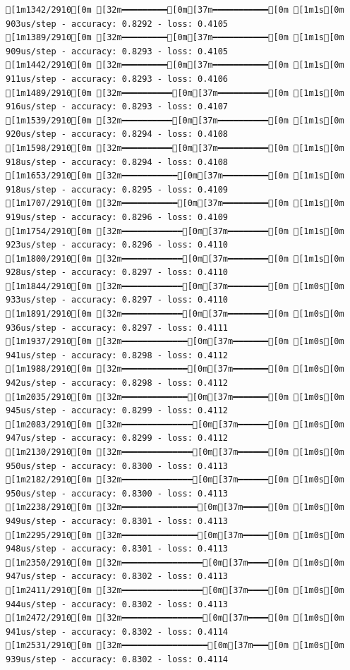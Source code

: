 \documentclass[
  letterpaper,
  DIV=11,
  numbers=noendperiod]{scrartcl}
\begin{document}
\begin{verbatim}
[1m1342/2910[0m [32m━━━━━━━━━[0m[37m━━━━━━━━━━━[0m [1m1s[0m 903us/step - accuracy: 0.8292 - loss: 0.4105
[1m1389/2910[0m [32m━━━━━━━━━[0m[37m━━━━━━━━━━━[0m [1m1s[0m 909us/step - accuracy: 0.8293 - loss: 0.4105
[1m1442/2910[0m [32m━━━━━━━━━[0m[37m━━━━━━━━━━━[0m [1m1s[0m 911us/step - accuracy: 0.8293 - loss: 0.4106
[1m1489/2910[0m [32m━━━━━━━━━━[0m[37m━━━━━━━━━━[0m [1m1s[0m 916us/step - accuracy: 0.8293 - loss: 0.4107
[1m1539/2910[0m [32m━━━━━━━━━━[0m[37m━━━━━━━━━━[0m [1m1s[0m 920us/step - accuracy: 0.8294 - loss: 0.4108
[1m1598/2910[0m [32m━━━━━━━━━━[0m[37m━━━━━━━━━━[0m [1m1s[0m 918us/step - accuracy: 0.8294 - loss: 0.4108
[1m1653/2910[0m [32m━━━━━━━━━━━[0m[37m━━━━━━━━━[0m [1m1s[0m 918us/step - accuracy: 0.8295 - loss: 0.4109
[1m1707/2910[0m [32m━━━━━━━━━━━[0m[37m━━━━━━━━━[0m [1m1s[0m 919us/step - accuracy: 0.8296 - loss: 0.4109
[1m1754/2910[0m [32m━━━━━━━━━━━━[0m[37m━━━━━━━━[0m [1m1s[0m 923us/step - accuracy: 0.8296 - loss: 0.4110
[1m1800/2910[0m [32m━━━━━━━━━━━━[0m[37m━━━━━━━━[0m [1m1s[0m 928us/step - accuracy: 0.8297 - loss: 0.4110
[1m1844/2910[0m [32m━━━━━━━━━━━━[0m[37m━━━━━━━━[0m [1m0s[0m 933us/step - accuracy: 0.8297 - loss: 0.4110
[1m1891/2910[0m [32m━━━━━━━━━━━━[0m[37m━━━━━━━━[0m [1m0s[0m 936us/step - accuracy: 0.8297 - loss: 0.4111
[1m1937/2910[0m [32m━━━━━━━━━━━━━[0m[37m━━━━━━━[0m [1m0s[0m 941us/step - accuracy: 0.8298 - loss: 0.4112
[1m1988/2910[0m [32m━━━━━━━━━━━━━[0m[37m━━━━━━━[0m [1m0s[0m 942us/step - accuracy: 0.8298 - loss: 0.4112
[1m2035/2910[0m [32m━━━━━━━━━━━━━[0m[37m━━━━━━━[0m [1m0s[0m 945us/step - accuracy: 0.8299 - loss: 0.4112
[1m2083/2910[0m [32m━━━━━━━━━━━━━━[0m[37m━━━━━━[0m [1m0s[0m 947us/step - accuracy: 0.8299 - loss: 0.4112
[1m2130/2910[0m [32m━━━━━━━━━━━━━━[0m[37m━━━━━━[0m [1m0s[0m 950us/step - accuracy: 0.8300 - loss: 0.4113
[1m2182/2910[0m [32m━━━━━━━━━━━━━━[0m[37m━━━━━━[0m [1m0s[0m 950us/step - accuracy: 0.8300 - loss: 0.4113
[1m2238/2910[0m [32m━━━━━━━━━━━━━━━[0m[37m━━━━━[0m [1m0s[0m 949us/step - accuracy: 0.8301 - loss: 0.4113
[1m2295/2910[0m [32m━━━━━━━━━━━━━━━[0m[37m━━━━━[0m [1m0s[0m 948us/step - accuracy: 0.8301 - loss: 0.4113
[1m2350/2910[0m [32m━━━━━━━━━━━━━━━━[0m[37m━━━━[0m [1m0s[0m 947us/step - accuracy: 0.8302 - loss: 0.4113
[1m2411/2910[0m [32m━━━━━━━━━━━━━━━━[0m[37m━━━━[0m [1m0s[0m 944us/step - accuracy: 0.8302 - loss: 0.4113
[1m2472/2910[0m [32m━━━━━━━━━━━━━━━━[0m[37m━━━━[0m [1m0s[0m 941us/step - accuracy: 0.8302 - loss: 0.4114
[1m2531/2910[0m [32m━━━━━━━━━━━━━━━━━[0m[37m━━━[0m [1m0s[0m 939us/step - accuracy: 0.8302 - loss: 0.4114

\end{verbatim}
\end{document}
